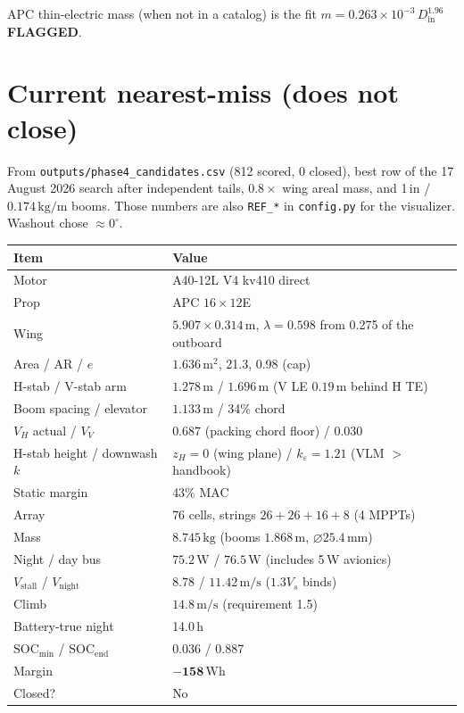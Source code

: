 \documentclass[11pt,letterpaper]{article}
\newcommand{\flag}{\textcolor{red!60!black}{\textbf{FLAGGED}}}
\newcommand{\code}[1]{\texttt{#1}}
\begin{document}
APC thin-electric mass (when not in a catalog) is the fit $m = 0.263\times 10^{-3}\, D_\mathrm{in}^{1.96}$ \flag{}.

\section{Current nearest-miss (does not close)}

From \code{outputs/phase4\_candidates.csv} (812 scored, 0 closed), best row of the 17 August 2026 search after independent tails, $0.8\times$ wing areal mass, and 1\,in / $0.174\,\mathrm{kg/m}$ booms. Those numbers are also \code{REF\_*} in \code{config.py} for the visualizer. Washout chose $\approx 0^\circ$.

\begin{center}
\begin{tabular}{@{}ll@{}}
\toprule
Item & Value \\
\midrule
Motor & A40-12L V4 kv410 direct \\
Prop & APC $16\times12$E \\
Wing & $5.907\times 0.314\,\mathrm{m}$, $\lambda=0.598$ from 0.275 of the outboard \\
Area / AR / $e$ & $1.636\,\mathrm{m^2}$, 21.3, 0.98 (cap) \\
H-stab / V-stab arm & $1.278\,\mathrm{m}$ / $1.696\,\mathrm{m}$ (V LE $0.19\,\mathrm{m}$ behind H TE) \\
Boom spacing / elevator & $1.133\,\mathrm{m}$ / 34\% chord \\
$V_H$ actual / $V_V$ & $0.687$ (packing chord floor) / $0.030$ \\
H-stab height / downwash $k$ & $z_H=0$ (wing plane) / $k_\varepsilon=1.21$ (VLM $>$ handbook) \\
Static margin & 43\% MAC \\
Array & 76 cells, strings $26+26+16+8$ (4 MPPTs) \\
Mass & $8.745\,\mathrm{kg}$ (booms $1.868\,\mathrm{m}$, $\varnothing 25.4\,\mathrm{mm}$) \\
Night / day bus & $75.2\,\mathrm{W}$ / $76.5\,\mathrm{W}$ (includes 5\,W avionics) \\
$V_\mathrm{stall}$ / $V_\mathrm{night}$ & $8.78$ / $11.42\,\mathrm{m/s}$ ($1.3 V_s$ binds) \\
Climb & $14.8\,\mathrm{m/s}$ (requirement 1.5) \\
Battery-true night & 14.0\,h \\
$\mathrm{SOC}_\mathrm{min}$ / $\mathrm{SOC}_\mathrm{end}$ & 0.036 / 0.887 \\
Margin & $\mathbf{-158\,\mathrm{Wh}}$ \\
Closed? & No \\
\bottomrule
\end{tabular}
\end{center}
\end{document}
